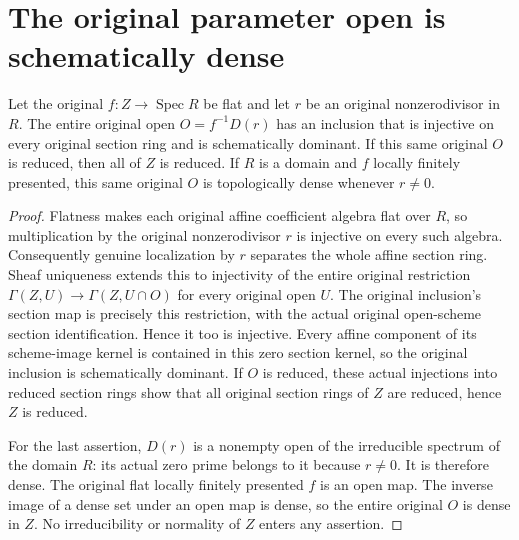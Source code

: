 \section{The original parameter open is schematically dense}
\label{sec:flat-parameter-open}

\begin{theorem}
\label{thm:flat-parameter-open}
\leanok
Let the original $f:Z\to\operatorname{Spec}R$ be flat and let
$r$ be an original nonzerodivisor in $R$. The entire original
open $O=f^{-1}D(r)$ has an inclusion that is injective on
every original section ring and is schematically dominant.
If this same original $O$ is reduced, then all of $Z$ is reduced.
If $R$ is a domain and $f$ locally finitely presented, this
same original $O$ is topologically dense whenever $r\ne0$.
\end{theorem}

\begin{proof}
Flatness makes each original affine coefficient algebra flat
over $R$, so multiplication by the original nonzerodivisor
$r$ is injective on every such algebra. Consequently genuine
localization by $r$ separates the whole affine section ring.
Sheaf uniqueness extends this to injectivity of the entire
original restriction $\Gamma(Z,U)\to\Gamma(Z,U\cap O)$ for
every original open $U$. The original inclusion's section
map is precisely this restriction, with the actual original
open-scheme section identification. Hence it too is injective.
Every affine component of its scheme-image kernel is
contained in this zero section kernel, so the original
inclusion is schematically dominant. If $O$ is reduced, these
actual injections into reduced section rings show that all
original section rings of $Z$ are reduced, hence $Z$ is reduced.

For the last assertion, $D(r)$ is a nonempty open of the
irreducible spectrum of the domain $R$: its actual zero
prime belongs to it because $r\ne0$. It is therefore dense.
The original flat locally finitely presented $f$ is an open
map. The inverse image of a dense set under an open map is
dense, so the entire original $O$ is dense in $Z$.
No irreducibility or normality of $Z$ enters any assertion.
\end{proof}
